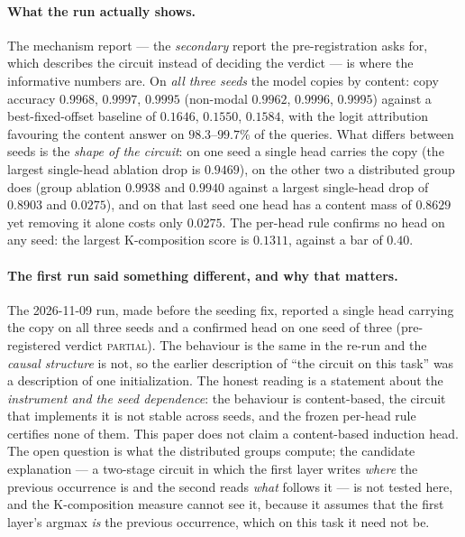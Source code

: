 \documentclass[11pt]{article}
\begin{document}
\paragraph{What the run actually shows.} The mechanism report --- the
\emph{secondary} report the pre-registration asks for, which describes the
circuit instead of deciding the verdict --- is where the informative numbers
are. On \emph{all three seeds} the model copies by content: copy accuracy
$0.9968$, $0.9997$, $0.9995$ (non-modal $0.9962$, $0.9996$, $0.9995$) against a best-fixed-offset
baseline of $0.1646$, $0.1550$, $0.1584$, with the logit attribution favouring the content
answer on $98.3$--$99.7\%$ of the queries. What differs between seeds is the
\emph{shape of the circuit}: on one seed a single head carries the copy (the
largest single-head ablation drop is $0.9469$), on the other two a
distributed group does (group ablation $0.9938$ and $0.9940$ against a
largest single-head drop of $0.8903$ and $0.0275$), and on that last
seed one head has a content mass of $0.8629$ yet removing it alone costs
only $0.0275$. The per-head rule confirms no head on any seed: the
largest K-composition score is $0.1311$, against a bar of $0.40$.

\paragraph{The first run said something different, and why that matters.} The
2026-11-09 run, made before the seeding fix, reported a single head carrying
the copy on all three seeds and a confirmed head on one seed of three
(pre-registered verdict \textsc{partial}). The behaviour is the same in the
re-run and the \emph{causal structure} is not, so the earlier description of
``the circuit on this task'' was a description of one initialization. The
honest reading is a statement about the \emph{instrument and the seed
dependence}: the behaviour is content-based, the circuit that implements it is
not stable across seeds, and the frozen per-head rule certifies none of them.
This paper does not claim a content-based induction head. The open question
is what the distributed groups compute; the candidate explanation --- a
two-stage circuit in which the first layer writes \emph{where} the previous
occurrence is and the second reads \emph{what} follows it --- is not tested
here, and the K-composition measure cannot see it, because it assumes that the
first layer's argmax \emph{is} the previous occurrence, which on this task it
need not be.
\end{document}
